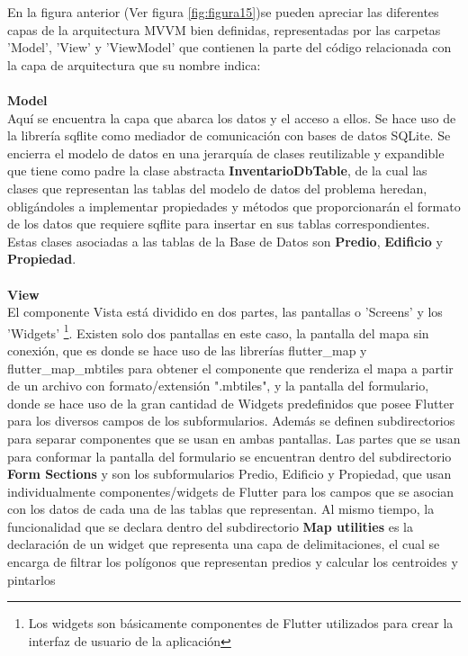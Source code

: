 En la figura anterior (Ver figura \ref{fig:figura15})se pueden apreciar las diferentes capas de la arquitectura MVVM bien definidas,
representadas por las carpetas 'Model', 'View' y 'ViewModel' que contienen la parte del código relacionada con la capa de arquitectura
que su nombre indica:\\\\
\textbf{Model}\label{item:Model}\\
Aquí se encuentra la capa que abarca los datos y el acceso a ellos. Se hace uso de la librería sqflite \cite{sqflite} como mediador de comunicación
con bases de datos SQLite. Se encierra el modelo de datos en una jerarquía de clases reutilizable y expandible que tiene como padre la clase abstracta \textbf{InventarioDbTable},
de la cual las clases que representan las tablas del modelo de datos del problema heredan, obligándoles a implementar propiedades y métodos que proporcionarán
el formato de los datos que requiere sqflite para insertar en sus tablas correspondientes. Estas clases asociadas a las tablas de la Base de Datos
son \textbf{Predio}, \textbf{Edificio} y \textbf{Propiedad}.
\\\\
\textbf{View}\\
El componente Vista está dividido en dos partes, las pantallas o 'Screens' y los 'Widgets'
\footnote{Los widgets son básicamente componentes de Flutter utilizados para crear la interfaz de usuario de
    la aplicación}.
Existen solo dos pantallas en este caso, la pantalla del mapa sin conexión, que es donde se hace uso de las librerías flutter\_map y flutter\_map\_mbtiles para
obtener el componente que renderiza el mapa a partir de un archivo con formato/extensión ".mbtiles", y la pantalla del formulario, donde se hace uso de la gran
cantidad de Widgets predefinidos que posee Flutter para los diversos campos de los subformularios. Además se definen subdirectorios para separar componentes que se
usan en ambas pantallas. Las partes que se usan para conformar la pantalla del formulario se encuentran dentro del subdirectorio \textbf{Form Sections} y son los
subformularios Predio, Edificio y Propiedad, que usan individualmente componentes/widgets de Flutter para los campos que se asocian con los datos de cada una de
las tablas que representan. Al mismo tiempo, la funcionalidad que se declara dentro del subdirectorio \textbf{Map utilities} es la declaración de un widget
que representa una capa de delimitaciones, el cual se encarga de filtrar los polígonos que representan predios y calcular los centroides y pintarlos\\
